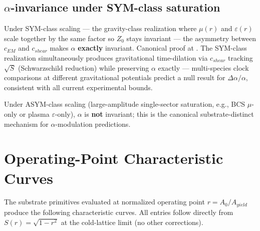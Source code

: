 \subsection{$\alpha$-invariance under SYM-class saturation}
\label{sec:vol9_alpha_invariance}

Under SYM-class scaling --- the gravity-class realization where $\mu(r)$ and $\varepsilon(r)$ scale together by the same factor so $Z_0$ stays invariant --- the asymmetry between $c_{EM}$ and $c_{shear}$ makes $\alpha$ \textbf{exactly} invariant. Canonical proof at . The SYM-class realization simultaneously produces gravitational time-dilation via $c_{shear}$ tracking $\sqrt{S}$ (Schwarzschild reduction) while preserving $\alpha$ exactly --- multi-species clock comparisons at different gravitational potentials predict a null result for $\Delta\alpha/\alpha$, consistent with all current experimental bounds.

Under ASYM-class scaling (large-amplitude single-sector saturation, e.g., BCS $\mu$-only or plasma $\varepsilon$-only), $\alpha$ is \textbf{not} invariant; this is the canonical substrate-distinct mechanism for $\alpha$-modulation predictions.

\section{Operating-Point Characteristic Curves}
\label{sec:vol9_characteristic_curves}

The substrate primitives evaluated at normalized operating point $r = A_0/A_{yield}$ produce the following characteristic curves. All entries follow directly from $S(r) = \sqrt{1 - r^2}$ at the cold-lattice limit (no other corrections).

